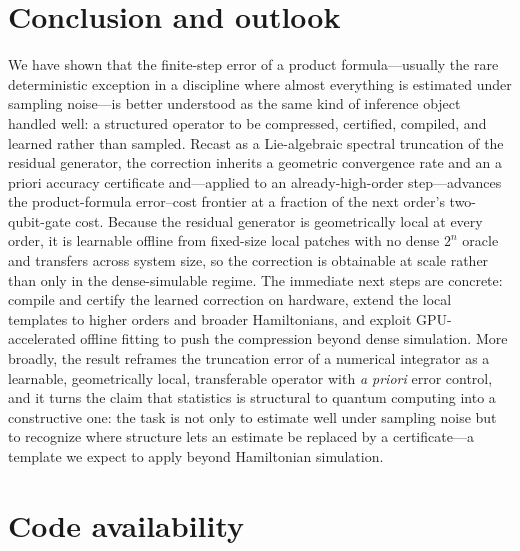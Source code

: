 \documentclass[aps,prresearch,reprint,superscriptaddress,nofootinbib,amsmath,amssymb]{revtex4-2}
\begin{document}
\section{Conclusion and outlook}

We have shown that the finite-step error of a product formula---usually the rare deterministic exception in a discipline where almost everything is estimated under sampling noise---is better understood as the same kind of inference object handled well: a structured operator to be compressed, certified, compiled, and learned rather than sampled. Recast as a Lie-algebraic spectral truncation of the residual generator, the correction inherits a geometric convergence rate and an a priori accuracy certificate and---applied to an already-high-order step---advances the product-formula error--cost frontier at a fraction of the next order's two-qubit-gate cost. Because the residual generator is geometrically local at every order, it is learnable offline from fixed-size local patches with no dense $2^n$ oracle and transfers across system size, so the correction is obtainable at scale rather than only in the dense-simulable regime. The immediate next steps are concrete: compile and certify the learned correction on hardware, extend the local templates to higher orders and broader Hamiltonians, and exploit GPU-accelerated offline fitting to push the compression beyond dense simulation. More broadly, the result reframes the truncation error of a numerical integrator as a learnable, geometrically local, transferable operator with \emph{a priori} error control, and it turns the claim that statistics is structural to quantum computing into a constructive one: the task is not only to estimate well under sampling noise but to recognize where structure lets an estimate be replaced by a certificate---a template we expect to apply beyond Hamiltonian simulation.



\section*{Code availability}
\end{document}
